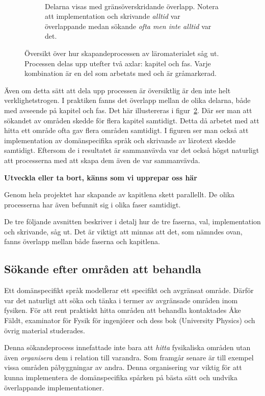 \begin{draft}
\begin{figure}[tph]
\begin{subfigure}[t]{0.5\textwidth}
        \caption{Delarna visas med gränsöverskridande överlapp. Notera att
        implementation och skrivande \textit{alltid} var överlappande medan
      sökande \textit{ofta men inte alltid} var det.}~\label{fig:oversiktB}
    \end{subfigure}
    \caption{Översikt över hur skapandeprocessen av läromaterialet såg ut.
  Processen delas upp utefter två axlar: kapitel och fas. Varje kombination
  är en del som arbetats med och är gråmarkerad.} 
\end{figure}

Även om detta sätt att dela upp processen är översiktlig är den inte helt
verklighetstrogen. I praktiken fanns det överlapp mellan de olika delarna, både
med avseende på kapitel och fas. Det här illustereras i
figur~\ref{fig:oversiktB}. Där ser man att sökandet av områden skedde för flera
kapitel samtidigt. Detta då arbetet med att hitta ett område ofta gav flera
områden samtidigt. I figuren ser man också att implementation av domänspecifika
språk och skrivande av lärotext skedde samtidigt. Eftersom de i resultatet är
sammanvävda var det också högst naturligt att processerna med att skapa dem
även de var sammanvävda.

\begin{binge}
\textbf{Utveckla eller ta bort, känns som vi upprepar oss här}

Genom hela projektet har skapande av kapitlena skett parallellt. De olika
processerna har även befunnit sig i olika faser samtidigt.
\end{binge}

De tre följande avsnitten beskriver i detalj hur de tre faserna, val,
implementation och skrivande, såg ut. Det är viktigt att minnas att det, som
nämndes ovan, fanns överlapp mellan både faserna och kapitlena.

\subsection{Sökande efter områden att behandla}\label{sec:valet}

Ett domänspecifikt språk modellerar ett specifikt och avgränsat område. Därför
var det naturligt att söka och tänka i termer av avgränsade områden inom
fysiken. För att rent praktiskt hitta områden att behandla kontaktades Åke
Fäldt, examinator för Fysik för ingenjörer\cite{tif085} och dess bok (University
Physics\cite{UP}) och övrig material studerades.

Denna sökandeprocess innefattade inte bara att \textit{hitta} fysikaliska
områden utan även \textit{organisera} dem i relation till varandra. Som framgår
senare är till exempel vissa områden påbyggningar av andra. Denna organisering
var viktig för att kunna implementera de domänspecifika spårken på bästa sätt
och undvika överlappande implementationer.


\end{draft}
